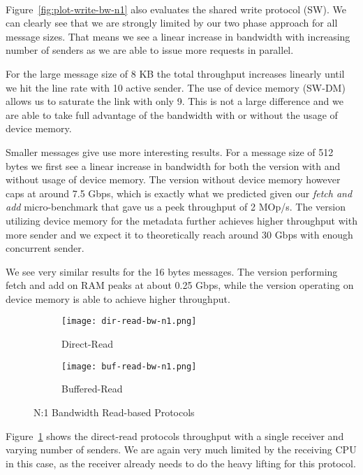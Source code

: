 \paragraph{} Figure~\ref{fig:plot-write-bw-n1} also evaluates the shared write protocol (SW). We can clearly see that we are strongly limited
by our two phase approach for all message sizes. That means we see a linear increase in bandwidth with increasing number of 
senders as we are able to issue more requests in parallel.

For the large message size of 8 KB the total throughput increases linearly until we hit the line rate with 10 
active sender. The use of device memory \mbox{(SW-DM)} allows us to saturate the link with only 9. This is not a 
large difference and we are able to take full advantage of the bandwidth with or without the usage of device memory.

Smaller messages give use more interesting results. For a message size of 512 bytes we first see a linear 
increase in bandwidth for both the version with and without usage of device memory. The version without device memory however
caps at around 7.5 Gbps, which is exactly what we predicted given our \emph{fetch and add} micro-benchmark that gave us a
peek throughput of 2 MOp/s. The version utilizing device memory for the metadata further achieves higher throughput with more
sender and we expect it to theoretically reach around 30 Gbps with enough concurrent sender.

We see very similar results for the 16 bytes messages. The version performing fetch and add on RAM peaks at about 0.25 Gbps, 
while the version operating on device memory is able to achieve higher throughput.



\begin{figure}[ht]
  \begin{subfigure}[b]{0.49\textwidth}
  \centering
  \texttt{[image: dir-read-bw-n1.png]}
  \caption{Direct-Read}
  \label{fig:plot-dirread-bw-n1}
  \end{subfigure}
  \begin{subfigure}[b]{0.49\textwidth}
  \centering
  \texttt{[image: buf-read-bw-n1.png]}
  \caption{Buffered-Read}
  \label{fig:plot-bufread-bw-n1}
  \end{subfigure}
  \caption{N:1 Bandwidth Read-based Protocols}
\end{figure}

Figure~\ref{fig:plot-dirread-bw-n1} shows the direct-read protocols throughput with a single receiver and varying number of senders.
We are again very much limited by the receiving CPU in this case, as the receiver already needs to do the heavy lifting for 
this protocol. 

